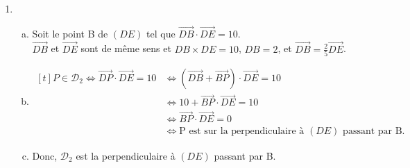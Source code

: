 \documentclass[12pt, a4paper]{article}
\begin{document}
\begin{Exercise}[number={121}]
\begin{enumerate}[1)]
\begin{enumerate}[a)]
                \end{enumerate}
        \item   \begin{enumerate}[a)]
                    \item   Soit le point B de $(DE)$ tel que $\overrightarrow{DB}\cdot\overrightarrow{DE}=10$. \\ $\overrightarrow{DB}$ et $\overrightarrow{DE}$ sont de même sens et $DB\times DE=10$, $DB=2$, et $\overrightarrow{DB}=\frac{2}{5}\overrightarrow{DE}$. \\
                    \item   $\begin{aligned}[t]
                                P\in\mathcal{D}_2\iff\overrightarrow{DP}\cdot\overrightarrow{DE}=10&\iff\left(\overrightarrow{DB}+\overrightarrow{BP}\right)\cdot\overrightarrow{DE}=10 &\\
                                &\iff 10+\overrightarrow{BP}\cdot\overrightarrow{DE}=10 &\\
                                &\iff \overrightarrow{BP}\cdot\overrightarrow{DE}=0 &\\
                                &\iff\text{P est sur la perpendiculaire à }(DE)\text{ passant par B.}
                            \end{aligned}$ 
                    \item   Donc, $\mathcal{D}_2$ est la perpendiculaire à $(DE)$ passant par B.
                \end{enumerate}
    \end{enumerate}
\end{Exercise}
\end{document}
